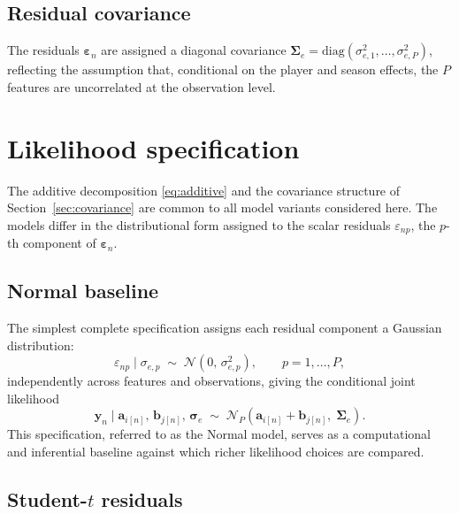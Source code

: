 \subsection{Residual covariance}

The residuals $\boldsymbol{\varepsilon}_n$ are assigned a diagonal covariance $\boldsymbol{\Sigma}_e = \mathrm{diag}(\sigma_{e,1}^2, \ldots, \sigma_{e,P}^2)$, reflecting the assumption that, conditional on the player and season effects, the $P$ features are uncorrelated at the observation level.

\section{Likelihood specification}
\label{sec:likelihood}

The additive decomposition \eqref{eq:additive} and the covariance structure of Section~\ref{sec:covariance} are common to all model variants considered here. The models differ in the distributional form assigned to the scalar residuals $\varepsilon_{np}$, the $p$-th component of $\boldsymbol{\varepsilon}_n$.

\subsection{Normal baseline}

The simplest complete specification assigns each residual component a Gaussian distribution:
\begin{equation}
\varepsilon_{np} \mid \sigma_{e,p} \;\sim\; \mathcal{N}(0,\, \sigma_{e,p}^2), \qquad p = 1, \ldots, P,
\label{eq:normal_resid}
\end{equation}
independently across features and observations, giving the conditional joint likelihood
\begin{equation}
\mathbf{y}_n \mid \mathbf{a}_{i[n]},\, \mathbf{b}_{j[n]},\, \boldsymbol{\sigma}_e \;\sim\; \mathcal{N}_P\!\left(\mathbf{a}_{i[n]} + \mathbf{b}_{j[n]},\; \boldsymbol{\Sigma}_e\right).
\label{eq:normal_likelihood}
\end{equation}
This specification, referred to as the Normal model, serves as a computational and inferential baseline against which richer likelihood choices are compared.

\subsection{Student-$t$ residuals}
\label{sec:t_likelihood}

